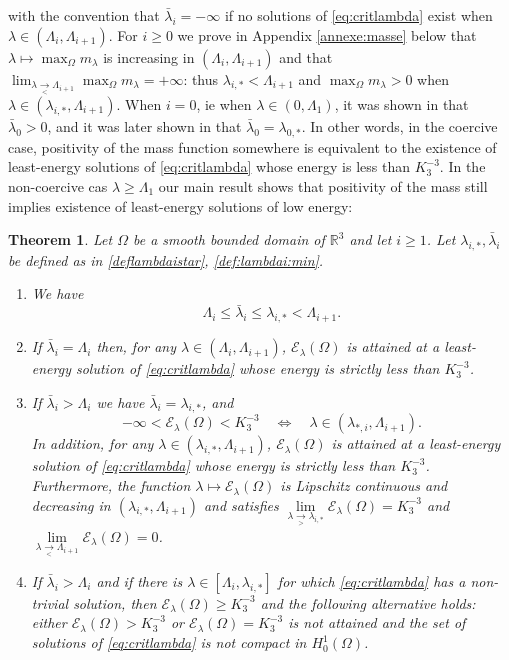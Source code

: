 \documentclass[10pt]{amsart}
\numberwithin{equation}{section}
\newcommand{\R}{\mathbb{R}}
\newcommand{\Om}{\Omega}
\theoremstyle{plain}
\newtheorem{theo}{Theorem}[section]%
\theoremstyle{remark}
\begin{document}
with the convention that $\bar{\lambda}_i = - \infty$ if no solutions of \eqref{eq:critlambda} exist when $\lambda \in (\Lambda_i, \Lambda_{i+1})$. For $i \ge 0$ we prove in Appendix \ref{annexe:masse} below that $\lambda \mapsto \max_{\Om} m_\lambda$ is increasing in $(\Lambda_i, \Lambda_{i+1})$ and that $\lim_{\lambda \underset{<}{\to}  \Lambda_{i+1}} \max_{\Om} m_\lambda  = + \infty$: thus $ \lambda_{i,*} < \Lambda_{i+1}$ and $\max_{\Om} m_\lambda >0$ when $\lambda \in (\lambda_{i,*}, \Lambda_{i+1})$. When $i=0$, ie when $\lambda \in (0, \Lambda_1)$, it was shown in \cite{BN} that $\bar{\lambda}_0 >0$, and it was later shown in \cite{Druetdim3} that $\bar{\lambda}_0 = \lambda_{0,*}$. In other words, in the coercive case, positivity of the mass function somewhere is equivalent to the existence of least-energy solutions of \eqref{eq:critlambda} whose energy is less than $K_3^{-3}$. In the non-coercive cas $\lambda \ge \Lambda_1$ our main result shows that positivity of the mass still implies existence of least-energy solutions of low energy: 

\begin{theo} \label{theoreme:n:3}
Let $\Omega$ be a smooth bounded domain of $\R^3$ and let $i \ge 1$. Let $\lambda_{i,*}, \bar{\lambda}_i$ be defined as in \eqref{deflambdaistar}, \eqref{def:lambdai:min}.
\begin{enumerate}
\item We have 
$$\Lambda_i \le \bar{\lambda}_i \le \lambda_{i,*} < \Lambda_{i+1}.$$ 
\item If $\bar{\lambda}_i = \Lambda_i$ then, for any $\lambda \in (\Lambda_i, \Lambda_{i+1})$, $\mathcal{E}_\lambda(\Om)$ is attained at a least-energy solution of \eqref{eq:critlambda} whose energy is strictly less than $K_3^{-3}$. 
\item If $\bar{\lambda}_i > \Lambda_i$ we have $\bar{\lambda}_i = \lambda_{i,*}$, and 
$$- \infty < \mathcal{E}_{\lambda}(\Om) < K_3^{-3} \quad \iff \quad \lambda \in (\lambda_{*,i}, \Lambda_{i+1}). $$
In addition, for any $\lambda \in (\lambda_{i,*}, \Lambda_{i+1})$, $\mathcal{E}_\lambda(\Om)$ is attained at a least-energy solution of \eqref{eq:critlambda} whose energy is strictly less than $K_3^{-3}$. Furthermore, the function $\lambda \mapsto \mathcal{E}_\lambda(\Om)$ is Lipschitz continuous and decreasing in $(\lambda_{i,*}, \Lambda_{i+1})$ and satisfies $ \lim \limits_{\lambda \underset{> }{\to} \lambda_{i,*}} \mathcal{E}_\lambda(\Om)= K_3^{-3}$ and $\lim \limits_{\lambda \underset{< }{\to} \Lambda_{i+1}}  \mathcal{E}_\lambda(\Om) = 0$.
\item If $\bar{\lambda}_i > \Lambda_i$ and if there is $\lambda \in [\Lambda_i, \lambda_{i,*}]$ for which \eqref{eq:critlambda} has a non-trivial solution, then $\mathcal{E}_{\lambda}(\Om) \ge K_3^{-3}$ and the following alternative holds: either $\mathcal{E}_{\lambda}(\Om) > K_3^{-3}$ or $\mathcal{E}_{\lambda}(\Om) = K_3^{-3}$ is not attained and the set of solutions of \eqref{eq:critlambda} is not compact in $H^1_0(\Om)$. 
\end{enumerate} 
\end{theo}
\end{document}
